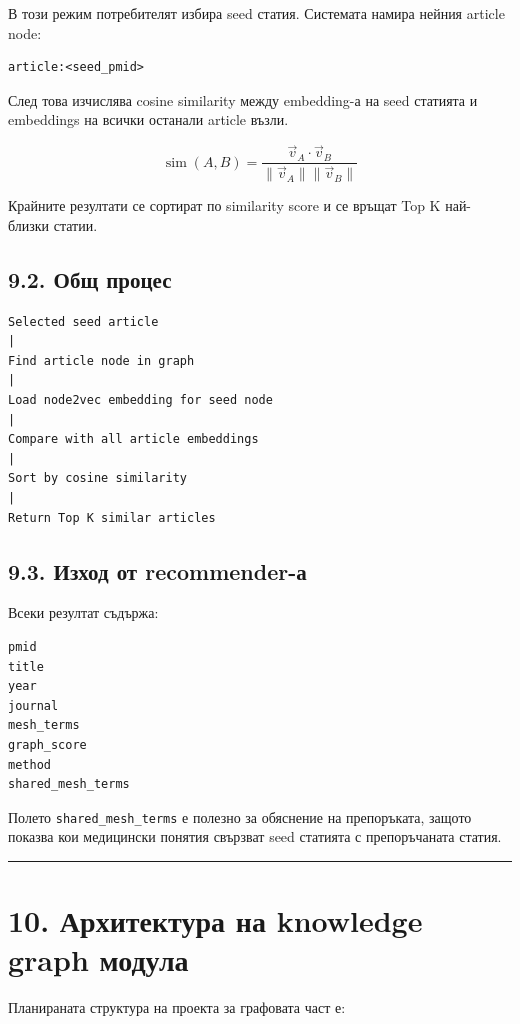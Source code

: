 \documentclass[12pt,a4paper]{article}
\begin{document}
В този режим потребителят избира seed статия. Системата намира нейния article node:

\begin{verbatim}
article:<seed_pmid>
\end{verbatim}

След това изчислява cosine similarity между embedding-а на seed статията и embeddings на всички останали article възли.

\begin{equation}
\operatorname{sim}(A, B) = \frac{\vec{v}_A \cdot \vec{v}_B}{\|\vec{v}_A\| \|\vec{v}_B\|}
\end{equation}

Крайните резултати се сортират по similarity score и се връщат Top K най-близки статии.

\subsection{9.2. Общ процес}

\begin{verbatim}
Selected seed article
|
Find article node in graph
|
Load node2vec embedding for seed node
|
Compare with all article embeddings
|
Sort by cosine similarity
|
Return Top K similar articles
\end{verbatim}

\subsection{9.3. Изход от recommender-а}

Всеки резултат съдържа:

\begin{verbatim}
pmid
title
year
journal
mesh_terms
graph_score
method
shared_mesh_terms
\end{verbatim}

Полето \texttt{shared\_mesh\_terms} е полезно за обяснение на препоръката, защото показва кои медицински понятия свързват seed статията с препоръчаната статия.

\vspace{0.5em}\hrule\vspace{1.0em}

\section{10. Архитектура на knowledge graph модула}

Планираната структура на проекта за графовата част е:
\end{document}
